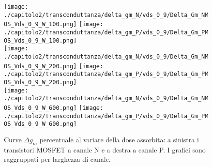 \clearpage

\begin{figure}[h!]
    \centering
    \texttt{[image: ./capitolo2/transconduttanza/delta\_gm\_N/vds\_0\_9/Delta\_Gm\_NMOS\_Vds\_0\_9\_W\_100.png]}
    \texttt{[image: ./capitolo2/transconduttanza/delta\_gm\_P/vds\_0\_9/Delta\_Gm\_PMOS\_Vds\_0\_9\_W\_100.png]}\\
    \vspace{0.2cm}
    \texttt{[image: ./capitolo2/transconduttanza/delta\_gm\_N/vds\_0\_9/Delta\_Gm\_NMOS\_Vds\_0\_9\_W\_200.png]}
    \texttt{[image: ./capitolo2/transconduttanza/delta\_gm\_P/vds\_0\_9/Delta\_Gm\_PMOS\_Vds\_0\_9\_W\_200.png]}\\
    \vspace{0.2cm}
    \texttt{[image: ./capitolo2/transconduttanza/delta\_gm\_N/vds\_0\_9/Delta\_Gm\_NMOS\_Vds\_0\_9\_W\_600.png]}
    \texttt{[image: ./capitolo2/transconduttanza/delta\_gm\_P/vds\_0\_9/Delta\_Gm\_PMOS\_Vds\_0\_9\_W\_600.png]}
    \caption[Dati $\% \Delta g_m $ al variare della dose]{Curve $\Delta g_m $ percentuale al variare della dose assorbita: a sinistra i transistori MOSFET a canale N e a destra a canale P. I grafici sono raggruppati per larghezza di canale.}
    \label{fig:delta_gm}


\end{figure}

\FloatBarrier

